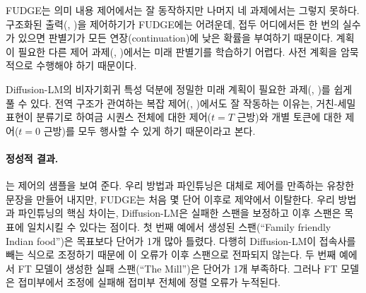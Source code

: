 \documentclass{article}
\begin{document}
FUDGE는 의미 내용 제어에서는 잘 동작하지만 나머지 네 과제에서는 그렇지 못하다. 구조화된 출력(\POS, \Syntax)을 제어하기가 FUDGE에는 어려운데, 접두 어디에서든 한 번의 실수가 있으면 판별기가 모든 연장(continuation)에 낮은 확률을 부여하기 때문이다. 계획이 필요한 다른 제어 과제(\Length, \Spans)에서는 미래 판별기를 학습하기 어렵다. 사전 계획을 암묵적으로 수행해야 하기 때문이다.

Diffusion-LM의 비자기회귀 특성 덕분에 정밀한 미래 계획이 필요한 과제(\Spans, \Length)를 쉽게 풀 수 있다. 전역 구조가 관여하는 복잡 제어(\POS, \Syntax)에서도 잘 작동하는 이유는, 거친-세밀 표현이 분류기로 하여금 시퀀스 전체에 대한 제어($t=T$ 근방)와 개별 토큰에 대한 제어($t=0$ 근방)를 모두 행사할 수 있게 하기 때문이라고 본다.

\paragraph{정성적 결과.}
는 \Syntax 제어의 샘플을 보여 준다. 우리 방법과 파인튜닝은 대체로 제어를 만족하는 유창한 문장을 만들어 내지만, FUDGE는 처음 몇 단어 이후로 제약에서 이탈한다.
우리 방법과 파인튜닝의 핵심 차이는, Diffusion-LM은 실패한 스팬을 보정하고 이후 스팬은 목표에 일치시킬 수 있다는 점이다. 첫 번째 예에서 생성된 스팬(``Family friendly Indian food'')은 목표보다 단어가 1개 많아 틀렸다. 다행히 Diffusion-LM이 접속사를 빼는 식으로 조정하기 때문에 이 오류가 이후 스팬으로 전파되지 않는다. 두 번째 예에서 FT 모델이 생성한 실패 스팬(``The Mill'')은 단어가 1개 부족하다. 그러나 FT 모델은 접미부에서 조정에 실패해 접미부 전체에 정렬 오류가 누적된다.
\end{document}
